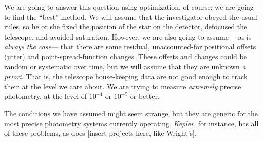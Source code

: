 \documentclass[12pt, letterpaper, preprint]{aastex}
\newcommand{\project}[1]{\textsl{#1}}
\newcommand{\foreign}[1]{\textsl{#1}}
\begin{document}
We are going to answer this question using optimization, of course;
  we are going to find the ``best'' method.
We will assume that the investigator obeyed the usual rules,
  so he or she fixed the position of the star on the detector,
  defocused the telescope,
  and avoided saturation.
However, we are also going to assume---%
  as is \emph{always the case}---%
  that there are some residual,
  unaccounted-for positional offsets (jitter) and point-spread-function changes.
These offsets and changes could be random or systematic over time,
  but we will assume that they are unknown \foreign{a priori}.
That is, the telescope house-keeping data are not good enough to track them at the level we care about.
We are trying to measure \emph{extremely} precise photometry,
  at the level of $10^{-4}$ or $10^{-5}$ or better.

The conditions we have assumed might seem strange,
  but they are generic for the most precise photometry systems currently operating.
\project{Kepler}, for instance, has all of these problems,
  as does [insert projects here, like Wright's].

\end{document}
